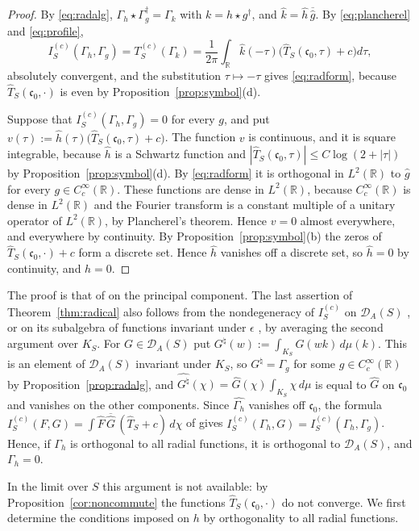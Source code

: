 \documentclass[11pt]{amsart}
\theoremstyle{remark}
\numberwithin{equation}{section}
\newcommand{\R}{\mathbb R}
\newcommand{\DA}{\mathcal D_A}
\newcommand{\cz}{\mathfrak c_0}
\begin{document}
\begin{proof}
By \eqref{eq:radalg}, $\Gamma_h\star\Gamma_g^\dagger=\Gamma_k$ with
$k=h\star g^\dagger$, and $\hat k=\hat h\,\overline{\hat g}$.  By
\eqref{eq:plancherel} and \eqref{eq:profile},
\[
  I^{(c)}_S(\Gamma_h,\Gamma_g)=T^{(c)}_S(\Gamma_k)
  =\frac1{2\pi}\int_\R\hat k(-\tau)\bigl(\widehat T_S(\cz,\tau)+c\bigr)d\tau ,
\]
absolutely convergent, and the substitution $\tau\mapsto-\tau$ gives
\eqref{eq:radform}, because $\widehat T_S(\cz,\cdot)$ is even by
Proposition~\ref{prop:symbol}(d).

Suppose that $I^{(c)}_S(\Gamma_h,\Gamma_g)=0$ for every $g$, and put
$v(\tau):=\hat h(\tau)\bigl(\widehat T_S(\cz,\tau)+c\bigr)$.  The function
$v$ is continuous, and it is square integrable, because $\hat h$ is a
Schwartz function and $|\widehat T_S(\cz,\tau)|\le C\log(2+|\tau|)$ by
Proposition~\ref{prop:symbol}(d).  By \eqref{eq:radform} it is orthogonal in
$L^2(\R)$ to $\hat g$ for every $g\in C_c^\infty(\R)$.  These functions are
dense in $L^2(\R)$, because $C_c^\infty(\R)$ is dense in $L^2(\R)$ and the
Fourier transform is a constant multiple of a unitary operator of $L^2(\R)$,
by Plancherel's theorem.  Hence $v=0$ almost everywhere, and everywhere by
continuity.  By Proposition~\ref{prop:symbol}(b) the zeros of
$\widehat T_S(\cz,\cdot)+c$ form a discrete set.  Hence $\hat h$ vanishes off
a discrete set, so $\hat h=0$ by continuity, and $h=0$.
\end{proof}

The proof is that of \cite[Theorem~6.5]{P43} on the principal component.
The last assertion of Theorem~\ref{thm:radical} also follows from the
nondegeneracy of $I^{(c)}_S$ on $\DA(S)$ \cite[Theorem~6.5]{P43}, or on its
subalgebra of functions invariant under $\epsilon$
\cite[Remark~6.19(ii)]{P43}, by
averaging the second argument over $K_S$.  For $G\in\DA(S)$ put
$G^\natural(w):=\int_{K_S}G(wk)\,d\mu(k)$.  This is an element of $\DA(S)$
invariant under $K_S$, so $G^\natural=\Gamma_g$ for some
$g\in C_c^\infty(\R)$ by Proposition~\ref{prop:radalg}, and
$\widehat{G^\natural}(\chi)=\widehat G(\chi)\int_{K_S}\chi\,d\mu$ is equal to
$\widehat G$ on $\cz$ and vanishes on the other components.  Since
$\widehat{\Gamma_h}$ vanishes off $\cz$, the formula
$I^{(c)}_S(F,G)=\int\widehat F\,\overline{\widehat G}\,(\widehat T_S+c)\,d\chi$
of \cite[(71)]{P43} gives
$I^{(c)}_S(\Gamma_h,G)=I^{(c)}_S(\Gamma_h,\Gamma_g)$.  Hence, if $\Gamma_h$ is
orthogonal to all radial functions, it is orthogonal to $\DA(S)$, and
$\Gamma_h=0$.

In the limit over $S$ this argument is not available: by
Proposition~\ref{cor:noncommute} the functions $\widehat T_S(\cz,\cdot)$ do
not converge.  We first determine the conditions imposed on $h$ by
orthogonality to all radial functions.
\end{document}
